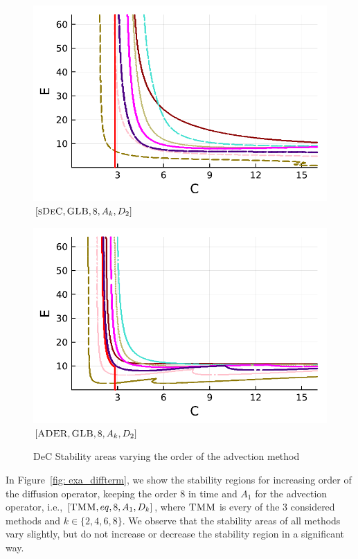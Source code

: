 \begin{figure}
\begin{minipage}[t]{0.32\textwidth}
		\includegraphics[width=\textwidth]{pdf/pdepics/diff/IMEXDeC_subtimesteps_gaussLobatto_adv_ord_1-8.pdf}
		\centering
		$[\textsc{sDeC},\textsc{GLB},8, A_k,D_2]$
	\end{minipage}
	\begin{minipage}[t]{0.32\textwidth}
		\includegraphics[width=\textwidth]{pdf/pdepics/diff/IMEXADER_gaussLobatto_adv_ord_1-8.pdf}
		\centering
		$[\textsc{ADER},\textsc{GLB},8, A_k,D_2]$
	\end{minipage}
	\caption{DeC Stability areas varying the order of the advection method}
	\label{fig: exa_advterm}
\end{figure}


In Figure~\ref{fig: exa_diffterm}, we show the stability regions for increasing order of the diffusion operator, keeping the order 8 in time and $A_1$ for the advection operator, i.e., $[\textsc{TMM},eq, 8, A_1,D_k]$, where $\textsc{TMM}$ is every of the 3 considered methods and $k \in \{2,4,6,8\}$.  We observe that the stability areas of all methods vary slightly, but do not increase or decrease the stability region in a significant way.

